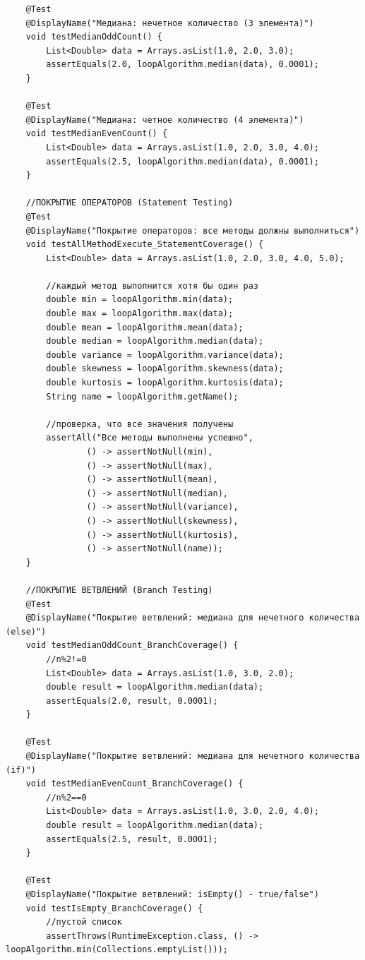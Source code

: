 \begin{verbatim}
    @Test
    @DisplayName("Медиана: нечетное количество (3 элемента)")
    void testMedianOddCount() {
        List<Double> data = Arrays.asList(1.0, 2.0, 3.0);
        assertEquals(2.0, loopAlgorithm.median(data), 0.0001);
    }

    @Test
    @DisplayName("Медиана: четное количество (4 элемента)")
    void testMedianEvenCount() {
        List<Double> data = Arrays.asList(1.0, 2.0, 3.0, 4.0);
        assertEquals(2.5, loopAlgorithm.median(data), 0.0001);
    }

    //ПОКРЫТИЕ ОПЕРАТОРОВ (Statement Testing)
    @Test
    @DisplayName("Покрытие операторов: все методы должны выполниться")
    void testAllMethodExecute_StatementCoverage() {
        List<Double> data = Arrays.asList(1.0, 2.0, 3.0, 4.0, 5.0);

        //каждый метод выполнится хотя бы один раз
        double min = loopAlgorithm.min(data);
        double max = loopAlgorithm.max(data);
        double mean = loopAlgorithm.mean(data);
        double median = loopAlgorithm.median(data);
        double variance = loopAlgorithm.variance(data);
        double skewness = loopAlgorithm.skewness(data);
        double kurtosis = loopAlgorithm.kurtosis(data);
        String name = loopAlgorithm.getName();

        //проверка, что все значения получены
        assertAll("Все методы выполнены успешно",
                () -> assertNotNull(min),
                () -> assertNotNull(max),
                () -> assertNotNull(mean),
                () -> assertNotNull(median),
                () -> assertNotNull(variance),
                () -> assertNotNull(skewness),
                () -> assertNotNull(kurtosis),
                () -> assertNotNull(name));
    }

    //ПОКРЫТИЕ ВЕТВЛЕНИЙ (Branch Testing)
    @Test
    @DisplayName("Покрытие ветвлений: медиана для нечетного количества (else)")
    void testMedianOddCount_BranchCoverage() {
        //n%2!=0
        List<Double> data = Arrays.asList(1.0, 3.0, 2.0);
        double result = loopAlgorithm.median(data);
        assertEquals(2.0, result, 0.0001);
    }

    @Test
    @DisplayName("Покрытие ветвлений: медиана для нечетного количества (if)")
    void testMedianEvenCount_BranchCoverage() {
        //n%2==0
        List<Double> data = Arrays.asList(1.0, 3.0, 2.0, 4.0);
        double result = loopAlgorithm.median(data);
        assertEquals(2.5, result, 0.0001);
    }

    @Test
    @DisplayName("Покрытие ветвлений: isEmpty() - true/false")
    void testIsEmpty_BranchCoverage() {
        //пустой список
        assertThrows(RuntimeException.class, () -> loopAlgorithm.min(Collections.emptyList()));


\end{verbatim}
